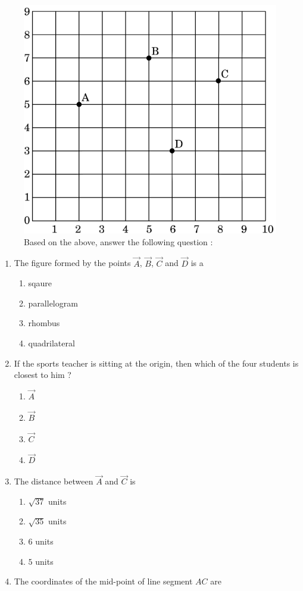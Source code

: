 \begin{enumerate}
	     	     \begin{figure}[ht]
		     \centering
		     \includegraphics[width=0.45\columnwidth,height=0.45\columnwidth]{figs/fwc3.png}
		     \caption{Based on the above, answer the following question :}
		     \label{fig:my_label}
	     \end{figure}
\begin{enumerate}[label=(\roman*)]
	\item The figure formed by the points $\vec{A}$, $\vec{B}$, $\vec{C}$ and $\vec{D}$ is a
		\begin{enumerate}[label=(\Alph*)]
			\item sqaure
			\item parallelogram
			\item rhombus
			\item quadrilateral
		\end{enumerate}
	\item If the sports teacher is sitting at the origin, then which of the four students is closest to him ?
		\begin{enumerate}[label=(\Alph*)]
			\item $\vec{A}$
			\item $\vec{B}$
			\item $\vec{C}$
			\item $\vec{D}$
		\end{enumerate}
	\item The distance between $\vec{A}$ and $\vec{C}$ is 
		\begin{enumerate}[label=(\Alph*)]
			\item $\sqrt{37}$ units
			\item $\sqrt{35}$ units
			\item $6$ units
			\item $5$ units
		\end{enumerate}
	\item The coordinates of the mid-point of line segment $AC$ are

\end{enumerate}
\end{enumerate}
